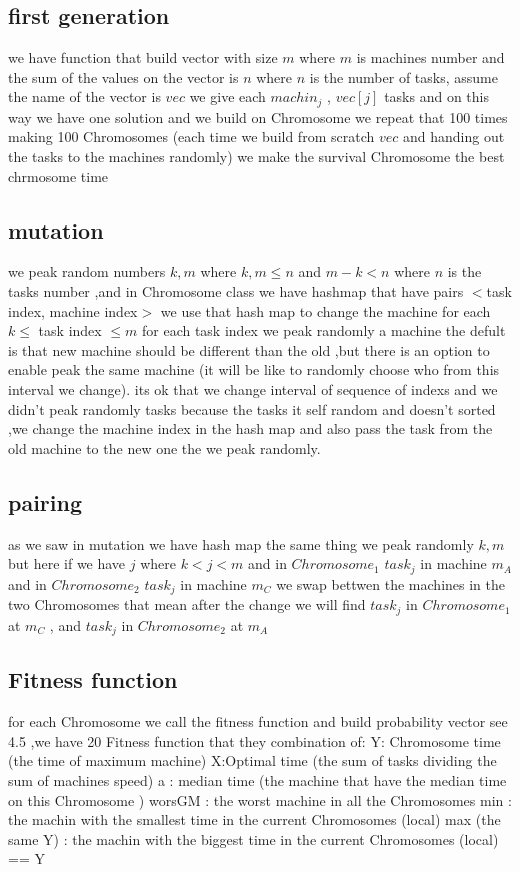 \documentclass[11pt,fullpage]{article}
\begin{document}
\subsection{first generation}
we have function that build vector with size $m$ where $m$ is machines number and the sum of the values on the vector is $n$ where $n$ is the number of tasks, assume the name of the vector is $vec$ we give each $machin_j$ , $vec[j]$ tasks and on this way we have one solution and we build on Chromosome we repeat that 100 times making 100 Chromosomes (each time we build from scratch  $vec$ and handing out the tasks to the machines randomly) we make the survival Chromosome the best chrmosome  time
\subsection{mutation}
we peak random numbers $k,m$ where $k,m \leq n$ and $m-k <n$ where $n$ is the tasks number ,and in Chromosome class we have hashmap that have pairs $<$task index, machine index$>$ we use that hash map to change the machine for each $k\leq$ task index $\leq m$ for each task index we peak randomly a machine the defult is that new machine should be different than the old ,but there is an option to enable peak the same machine (it will be like to randomly choose who from this interval we change).\newline
its ok that we  change   interval of sequence of indexs and we didn't  peak randomly tasks because the tasks it self random and doesn't sorted ,we change the machine index in the hash map and also pass the task from the old machine to the new one the we peak randomly.\newline
 \subsection{pairing}
as we saw in mutation we have hash map the same thing we peak randomly $k,m$ but here if we have $j$ where $k<j<m$ and in $Chromosome_1$  $task_j$ in machine $m_A$ and in $Chromosome_2$  $task_j$ in machine $m_C$ we swap bettwen the machines in the two Chromosomes that mean after the change we will find $task_j$ in $Chromosome_1$ at $m_C$ , and $task_j$ in $Chromosome_2$ at $m_A$
\subsection{Fitness function} 
for each Chromosome we call the fitness function and build probability vector see 4.5 ,we have 20 Fitness function that they combination of:\newline
Y: Chromosome time (the time of maximum machine)\newline
X:Optimal time (the sum of tasks dividing the sum of machines speed)\newline
a : median time (the machine that have the median time on this Chromosome )
worsGM : the worst machine in all the Chromosomes\newline
min : the machin with the smallest time in the current Chromosomes (local)\newline
max (the same Y) : the machin with the biggest time in the current Chromosomes (local) == Y\newline
\end{document}
